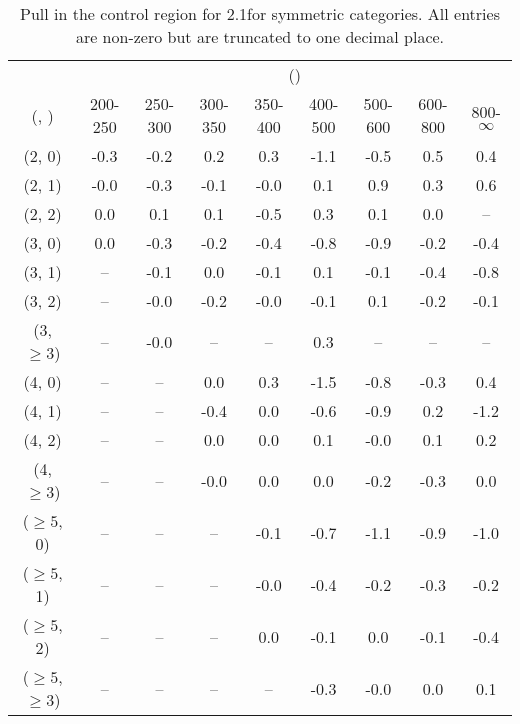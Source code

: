 \begin{table}[h!]
\tiny
\centering
\caption{Pull in the \mj control region for 2.1\ifb for symmetric categories. All entries are non-zero but are truncated to one decimal place.\label{tab:pullsepnaive_mu_ewk_sym}}
\begin{tabular}
{ccccccccc}
	\hline\hline
	& \multicolumn{8}{c}{\scalht (\gev)} \\ 
	 (\njet,  \nb) & 200-250 & 250-300 & 300-350 & 350-400 & 400-500 & 500-600 & 600-800 & 800-$\infty$ \\ [0.8ex] 
\hline
	(2, 0) & -0.3 & -0.2 & 0.2 & 0.3 & -1.1 & -0.5 & 0.5 & 0.4 \\[0.5ex] 
	(2, 1) & -0.0 & -0.3 & -0.1 & -0.0 & 0.1 & 0.9 & 0.3 & 0.6 \\[0.5ex] 
	(2, 2) & 0.0 & 0.1 & 0.1 & -0.5 & 0.3 & 0.1 & 0.0 & -- \\[0.5ex] 
	(3, 0) & 0.0 & -0.3 & -0.2 & -0.4 & -0.8 & -0.9 & -0.2 & -0.4 \\[0.5ex] 
	(3, 1) & -- & -0.1 & 0.0 & -0.1 & 0.1 & -0.1 & -0.4 & -0.8 \\[0.5ex] 
	(3, 2) & -- & -0.0 & -0.2 & -0.0 & -0.1 & 0.1 & -0.2 & -0.1 \\[0.5ex] 
	(3, $\ge3$) & -- & -0.0 & -- & -- & 0.3 & -- & -- & -- \\[0.5ex] 
	(4, 0) & -- & -- & 0.0 & 0.3 & -1.5 & -0.8 & -0.3 & 0.4 \\[0.5ex] 
	(4, 1) & -- & -- & -0.4 & 0.0 & -0.6 & -0.9 & 0.2 & -1.2 \\[0.5ex] 
	(4, 2) & -- & -- & 0.0 & 0.0 & 0.1 & -0.0 & 0.1 & 0.2 \\[0.5ex] 
	(4, $\ge3$) & -- & -- & -0.0 & 0.0 & 0.0 & -0.2 & -0.3 & 0.0 \\[0.5ex] 
	($\ge5$, 0) & -- & -- & -- & -0.1 & -0.7 & -1.1 & -0.9 & -1.0 \\[0.5ex] 
	($\ge5$, 1) & -- & -- & -- & -0.0 & -0.4 & -0.2 & -0.3 & -0.2 \\[0.5ex] 
	($\ge5$, 2) & -- & -- & -- & 0.0 & -0.1 & 0.0 & -0.1 & -0.4 \\[0.5ex] 
	($\ge5$, $\ge3$) & -- & -- & -- & -- & -0.3 & -0.0 & 0.0 & 0.1 \\[0.5ex] 
	\hline
	\hline
\end{tabular}
\end{table}
